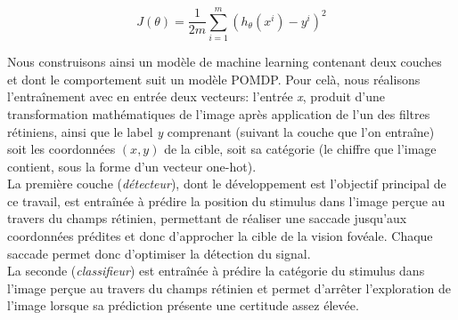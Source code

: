 \begin{equation}
J(\theta) = \frac{1}{2m} \sum_{i=1}^m (h_\theta(x^i)-y^i)^2
\label{eqn:Cost}
\end{equation}

Nous construisons ainsi un modèle de machine learning contenant deux couches et dont le comportement suit un modèle POMDP. Pour celà, nous réalisons l'entraînement avec en entrée deux vecteurs: l'entrée \textit{x}, produit d'une transformation mathématiques de l'image après application de l'un des filtres rétiniens, ainsi que le label \textit{y} comprenant (suivant la couche que l'on entraîne) soit les coordonnées $(x,y)$ de la cible, soit sa catégorie (le chiffre que l'image contient, sous la forme d'un vecteur one-hot).\\
 La première couche (\textit{détecteur}), dont le développement est l'objectif principal de ce travail, est entraînée à prédire la position du stimulus dans l'image perçue au travers du champs rétinien, permettant de réaliser une saccade jusqu'aux coordonnées prédites et donc d'approcher la cible de la vision fovéale. Chaque saccade permet donc d'optimiser la détection du signal.\autocite{Friston2012}\\
La seconde (\textit{classifieur}) est entraînée à prédire la catégorie du stimulus dans l'image perçue au travers du champs rétinien et permet d'arrêter l'exploration de l'image lorsque sa prédiction présente une certitude assez élevée.